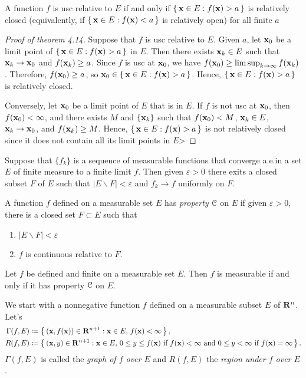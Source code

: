 \begin{theorem*}[4.14]
A function $f$ is usc relative to $E$ if and only if $\left\{\,\mathbf{x}\in
  E:f(\mathbf{x})>a\,\right\}$ is relatively closed (equivalently, if
$\left\{\,\mathbf{x}\in E:f(\mathbf{x})<a\,\right\}$ is relatively open) for all finite
$a$
\end{theorem*}
\begin{proof}[Proof of theorem 4.14]
Suppose that $f$ is usc relative to $E$. Given $a$, let $\mathbf{x}_0$ be a limit
point of $\left\{\,\mathbf{x}\in E:f(\mathbf{x})>a\,\right\}$ in $E$. Then there exists
$\mathbf{x}_k\in E$ such that $\mathbf{x}_k\to\mathbf{x}_0$ and $f(\mathbf{x}_k)\geq a$. Since $f$
is usc at $\mathbf{x}_0$, we have $f(\mathbf{x}_0)\geq\limsup_{k\to\infty}
f(\mathbf{x}_k)$. Therefore, $f(\mathbf{x}_0)\geq a$, so $\mathbf{x}_0\in\left\{\,\mathbf{x}\in
  E:f(\mathbf{x})>a\,\right\}$. Hence, $\left\{\,\mathbf{x}\in E:f(\mathbf{x})>a\,\right\}$
is relatively closed.

Conversely, let $\mathbf{x}_0$ be a limit point of $E$ that is in $E$. If $f$ is
not usc at $\mathbf{x}_0$, then $f(\mathbf{x}_0)<\infty$, and there exists $M$ and
$\left\{ \mathbf{x}_k \right\}$ such that $f(\mathbf{x}_0)<M$, $\mathbf{x}_k\in E$,
$\mathbf{x}_k\to\mathbf{x}_0$, and $f(\mathbf{x}_k)\geq M$. Hence, $\left\{\,\mathbf{x}\in
  E:f(\mathbf{x})>a\,\right\}$ is not relatively closed since it does not contain
all its limit points in $E$>
\end{proof}
\begin{theorem*}
Suppose that $\{f_k\}$ is a sequence of measurable functions that converge
a.e.\@ in a set $E$ of finite measure to a finite limit $f$. Then given
$\varepsilon>0$ there exits a closed subset $F$ of $E$ such that $|E\smallsetminus
F|<\varepsilon$ and $f_k\to f$ uniformly on $F$.
\end{theorem*}
A function $f$ defined on a measurable set $E$ has \emph{property $\mathcal{C}$}
on $E$ if given $\varepsilon>0$, there is a closed set $F\subset E$ such
that
\begin{enumerate}[label=(\roman*)]
\item $|E\smallsetminus F|<\varepsilon$
\item $f$ is continuous relative to $F$.
\end{enumerate}
\begin{theorem*}
Let $f$ be defined and finite on a measurable set $E$. Then $f$ is
measurable if and only if it has property $\mathcal{C}$ on $E$.
\end{theorem*}

We start with a nonnegative function $f$ defined on a measurable subset $E$
of $\mathbf{R}^n$. Let's
\begin{equation}
\label{eq:graph-and-region}
\begin{aligned}
\Gamma(f,E)&\coloneqq\left\{\,(\mathbf{x},f(\mathbf{x}))\in\mathbf{R}^{n+1}:\text{$\mathbf{x}\in
    E$, $f(\mathbf{x})<\infty$}\,\right\},\\
R(f,E)&\coloneqq\left\{\,(\mathbf{x},y)\in\mathbf{R}^{n+1}:\text{$\mathbf{x}\in E$, $0\leq
    y\leq f(\mathbf{x})$ if $f(\mathbf{x})<\infty$ and $0\leq y<\infty$ if
    $f(\mathbf{x})=\infty$}\,\right\}.
\end{aligned}
\end{equation}
$\Gamma(f,E)$ is called the \emph{graph of $f$ over $E$} and $R(f,E)$ the
\emph{region under $f$ over $E$}.

